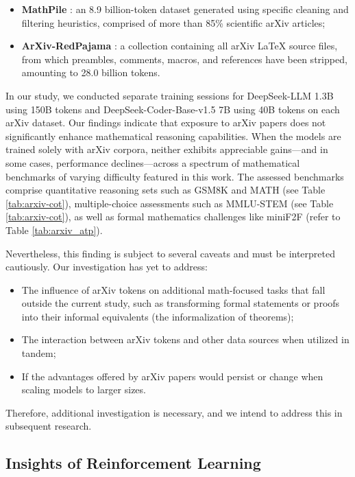 \begin{itemize}[topsep=0pt]
\begin{itemize}[topsep=0pt]
    \item \textbf{MathPile} \citep{mathpile}: an 8.9 billion-token dataset generated using specific cleaning and filtering heuristics, comprised of more than 85\% scientific arXiv articles;
    \item \textbf{ArXiv-RedPajama} \citep{redpajama}: a collection containing all arXiv LaTeX source files, from which preambles, comments, macros, and references have been stripped, amounting to 28.0 billion tokens.
\end{itemize}

In our study, we conducted separate training sessions for DeepSeek-LLM 1.3B using 150B tokens and DeepSeek-Coder-Base-v1.5 7B using 40B tokens on each arXiv dataset. Our findings indicate that exposure to arXiv papers does not significantly enhance mathematical reasoning capabilities. When the models are trained solely with arXiv corpora, neither exhibits appreciable gains—and in some cases, performance declines—across a spectrum of mathematical benchmarks of varying difficulty featured in this work. The assessed benchmarks comprise quantitative reasoning sets such as GSM8K and MATH (see Table \ref{tab:arxiv-cot}), multiple-choice assessments such as MMLU-STEM (see Table \ref{tab:arxiv-cot}), as well as formal mathematics challenges like miniF2F (refer to Table \ref{tab:arxiv_atp}).

Nevertheless, this finding is subject to several caveats and must be interpreted cautiously. Our investigation has yet to address:

\begin{itemize}[topsep=0pt]
    \item The influence of arXiv tokens on additional math-focused tasks that fall outside the current study, such as transforming formal statements or proofs into their informal equivalents (the informalization of theorems);
    \item The interaction between arXiv tokens and other data sources when utilized in tandem;
    \item If the advantages offered by arXiv papers would persist or change when scaling models to larger sizes.
\end{itemize}

Therefore, additional investigation is necessary, and we intend to address this in subsequent research.

\subsection{Insights of Reinforcement Learning}

\end{itemize}
